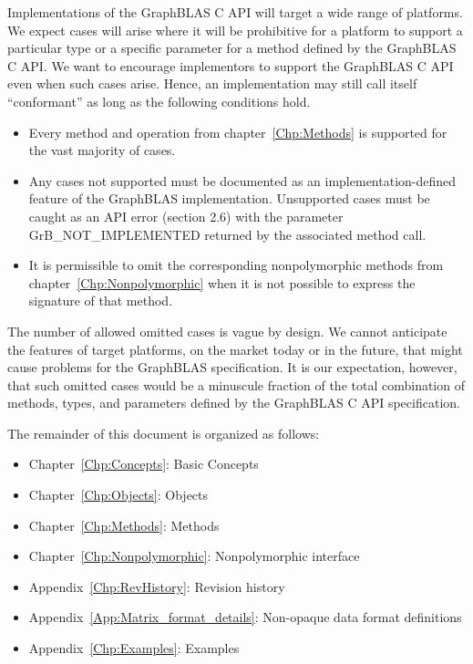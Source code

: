 \documentclass[11pt]{extbook}
\begin{document}
Implementations of the GraphBLAS C API will target a wide range of platforms.  We expect cases will arise where it will be 
prohibitive for a platform to support a particular type or a specific parameter for a method defined by the GraphBLAS C API.   We 
want to encourage implementors to support  the GraphBLAS C API even when such cases arise.  Hence, an implementation
may still call itself ``conformant'' as long as the following conditions hold.
\begin{itemize}
\item Every method and operation from chapter~\ref{Chp:Methods} is supported for the vast majority of cases.  
\item  Any cases not supported  must be documented as an implementation-defined feature of the GraphBLAS implementation. 
Unsupported cases must be caught as an API error (section 2.6) with the parameter {\sf GrB\_NOT\_IMPLEMENTED} returned by the associated method call. 
\item It is permissible to omit the corresponding nonpolymorphic methods from chapter~\ref{Chp:Nonpolymorphic} when it is not
possible to express the signature of that method.  
\end{itemize}
The number of allowed omitted cases is vague by design.  We cannot anticipate the features of target platforms,
on the market today or in the future, that might cause problems for the GraphBLAS specification.  It is our expectation, however,  that such omitted 
cases  would be a minuscule fraction of the total combination of methods, types, and parameters defined by the GraphBLAS C API specification.

The remainder of this document is organized as follows:
\begin{itemize}
\item Chapter~\ref{Chp:Concepts}: Basic Concepts
\item Chapter~\ref{Chp:Objects}: Objects
\item Chapter~\ref{Chp:Methods}: Methods
\item Chapter~\ref{Chp:Nonpolymorphic}: Nonpolymorphic interface
\item Appendix~\ref{Chp:RevHistory}: Revision history
\item Appendix~\ref{App:Matrix_format_details}: Non-opaque data format definitions
\item Appendix~\ref{Chp:Examples}: Examples
\end{itemize}

\end{document}
